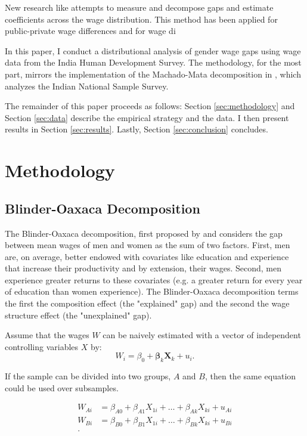 \documentclass[12pt]{article}
\begin{document}
New research like attempts to measure and decompose gaps and estimate coefficients across the wage distribution. This method has been applied for public-private wage differences \citep{AzamPrakash2015} and for wage di

In this paper, I conduct a distributional analysis of gender wage gaps using wage data from the India Human Development Survey. The methodology, for the most part, mirrors the implementation of the Machado-Mata decomposition in \citet{Khanna2012}, which analyzes the Indian National Sample Survey.


The remainder of this paper proceeds as follows: Section \ref{sec:methodology} and Section \ref{sec:data} describe the empirical strategy and the data. I then present results in Section \ref{sec:results}. Lastly, Section \ref{sec:conclusion} concludes. 


\section{Methodology
\label{sec:methodology}}

\subsection{Blinder-Oaxaca Decomposition
\label{subsec:BOdecomp}}
The Blinder-Oaxaca decomposition, first proposed by \citet{Blinder1973} and \citet{Oaxaca1973} considers the gap between mean wages of men and women as the sum of two factors. First, men are, on average, better endowed with covariates like education and experience that increase their productivity and by extension, their wages. Second, men experience greater returns to these covariates (e.g. a greater return for every year of education than women experience). The Blinder-Oaxaca decomposition terms the first the composition effect (the "explained" gap) and the second the wage structure effect (the "unexplained" gap).

Assume that the wages $W$ can be naively estimated with a vector of independent controlling variables $X$ by:
\begin{equation}
	W_i = \beta_0 + \mathbf{\beta}_k \mathbf{X}_k + u_i 
.\end{equation}

If the sample can be divided into two groups, $A$ and $B$, then the same equation could be used over subsamples.

\begin{align*}
	W_{Ai} &= \beta_{A0} + \beta_{A1}X_{1i} + \ldots +  \beta_{Ak}X_{ki} + u_{Ai} \\
	W_{Bi} &= \beta_{B0} + \beta_{B1}X_{1i} + \ldots + \beta_{Bk}X_{ki} + u_{Bi} \\
.\end{align*}
\end{document}
